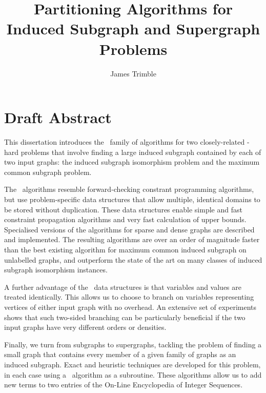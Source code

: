 \documentclass[notitlepage]{report}
\title{Partitioning Algorithms for Induced Subgraph and Supergraph Problems}
\author{James Trimble}
\newcommand{\McSplit}{\textproc{McSplit}}
\begin{document}
\maketitle
\thispagestyle{empty}

\section*{Draft Abstract}

This dissertation introduces the \McSplit\ family of algorithms for two
    closely-related \NP-hard problems that involve finding a large induced
    subgraph contained by each of two input graphs: the induced subgraph
    isomorphism problem and the maximum common subgraph problem.

The \McSplit\ algorithms resemble forward-checking constrant programming
algorithms, but use problem-specific data structures that allow
multiple, identical domains to be stored without duplication.  These data structures
enable simple and fast constraint propagation algorithms and very fast calculation of
upper bounds.  Specialised versions of the algorithms for sparse and dense graphs are
described and implemented.
The resulting algorithms are over an order of magnitude faster
than the best existing algorithm for maximum common induced subgraph on unlabelled
graphs, and outperform the state of the art on many classes of induced subgraph
isomorphism instances.

A further advantage of the \McSplit\ data structures is that variables and
values are treated identically. This allows us to choose to branch on variables
representing vertices of either input graph with no overhead.  An extensive
set of experiments shows that such two-sided branching can be particularly
beneficial if the two input graphs have very different orders or densities.

Finally, we turn from subgraphs to supergraphs, tackling the problem of
finding a small graph that contains every member of a given family of graphs
as an induced subgraph.  Exact and heuristic techniques are developed for
this problem, in each case using a \McSplit\ algorithm as a subroutine.
These algorithms allow us to add new terms to two entries of the
On-Line Encyclopedia of Integer Sequences.
\end{document}
